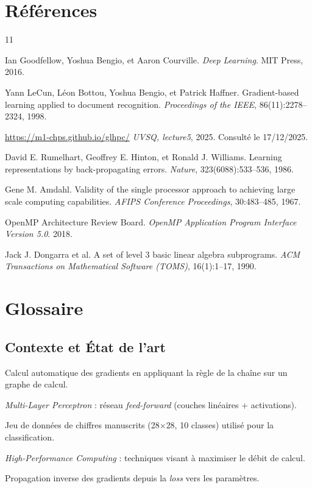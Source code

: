 \documentclass[a4paper,11pt]{article}
\begin{document}
\section{Références}
\begin{thebibliography}{11}

Ian Goodfellow, Yoshua Bengio, et Aaron Courville.
\textit{Deep Learning}.
MIT Press, 2016.

Yann LeCun, Léon Bottou, Yoshua Bengio, et Patrick Haffner.
Gradient-based learning applied to document recognition.
\textit{Proceedings of the IEEE}, 86(11):2278--2324, 1998.

\url{https://m1-chps.github.io/glhpc/}
\textit{UVSQ, lecture5}, 2025. Consulté le 17/12/2025.

David E. Rumelhart, Geoffrey E. Hinton, et Ronald J. Williams.
Learning representations by back-propagating errors.
\textit{Nature}, 323(6088):533--536, 1986.

Gene M. Amdahl.
Validity of the single processor approach to achieving large scale computing capabilities.
\textit{AFIPS Conference Proceedings}, 30:483--485, 1967.

OpenMP Architecture Review Board.
\textit{OpenMP Application Program Interface Version 5.0}.
2018.

Jack J. Dongarra et al.
A set of level 3 basic linear algebra subprograms.
\textit{ACM Transactions on Mathematical Software (TOMS)}, 16(1):1--17, 1990.

\end{thebibliography}

\section{Glossaire}
\subsection*{Contexte et État de l'art}
\begin{description}[style=multiline, leftmargin=3cm, font=\bfseries]
\item[Autodifférentiation] Calcul automatique des gradients en appliquant la règle de la chaîne sur un graphe de calcul.
\item[MLP] \textit{Multi-Layer Perceptron} : réseau \textit{feed-forward} (couches linéaires + activations).
\item[MNIST] Jeu de données de chiffres manuscrits (28$\times$28, 10 classes) utilisé pour la classification.
\item[HPC] \textit{High-Performance Computing} : techniques visant à maximiser le débit de calcul.
\item[Backpropagation] Propagation inverse des gradients depuis la \textit{loss} vers les paramètres.
\end{description}
\end{document}
